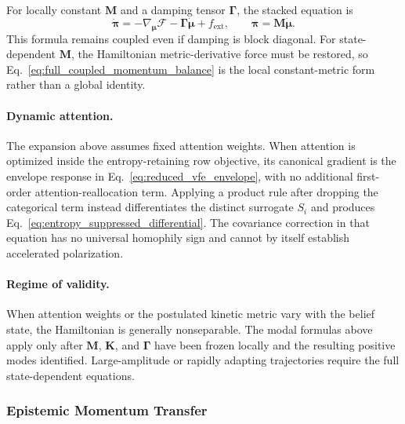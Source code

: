 \documentclass[12pt]{article}
\begin{document}
For locally constant $\mathbf M$ and a damping tensor $\boldsymbol\Gamma$, the stacked equation is
\begin{equation}
\boxed{
\dot{\boldsymbol\pi}
=-\nabla_{\boldsymbol\mu}\mathcal F
-\boldsymbol\Gamma\dot{\boldsymbol\mu}
+f_{\mathrm{ext}},
\qquad
\boldsymbol\pi=\mathbf M\dot{\boldsymbol\mu}.}
\label{eq:full_coupled_momentum_balance}
\end{equation}
This formula remains coupled even if damping is block diagonal.  For state-dependent $\mathbf M$, the Hamiltonian metric-derivative force must be restored, so Eq.~\eqref{eq:full_coupled_momentum_balance} is the local constant-metric form rather than a global identity.

\paragraph{Dynamic attention.} The expansion above assumes fixed attention weights. When attention is optimized inside the entropy-retaining row objective, its canonical gradient is the envelope response in Eq.~\eqref{eq:reduced_vfe_envelope}, with no additional first-order attention-reallocation term. Applying a product rule after dropping the categorical term instead differentiates the distinct surrogate $S_i$ and produces Eq.~\eqref{eq:entropy_suppressed_differential}. The covariance correction in that equation has no universal homophily sign and cannot by itself establish accelerated polarization.

\paragraph{Regime of validity.} When attention weights or the postulated kinetic metric vary with the belief state, the Hamiltonian is generally nonseparable.  The modal formulas above apply only after $\mathbf M$, $\mathbf K$, and $\boldsymbol\Gamma$ have been frozen locally and the resulting positive modes identified.  Large-amplitude or rapidly adapting trajectories require the full state-dependent equations.


\subsubsection{Epistemic Momentum Transfer}
\end{document}
